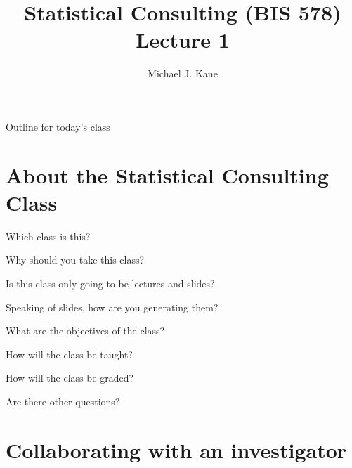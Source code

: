 \documentclass[14pt]{beamer}
\title{Statistical Consulting (BIS 578) Lecture 1}
\author{Michael J. Kane}
\date{}
\begin{document}
\begin{frame}
  \titlepage
\end{frame}

\begin{frame}{Outline for today's class}
  \tableofcontents
  \let\thefootnote\relax{}
\end{frame}

\section{About the Statistical Consulting Class}

\begin{frame}{Which class is this?}
\end{frame}

\begin{frame}{Why should you take this class?}
\end{frame}

\begin{frame}{Is this class only going to be lectures and slides?}
\end{frame}

\begin{frame}{Speaking of slides, how are you generating them?}
\end{frame}

\begin{frame}{What are the objectives of the class?}
\end{frame}

\begin{frame}{How will the class be taught?}
\end{frame}

\begin{frame}{How will the class be graded?}
\end{frame}

\begin{frame}
Are there other questions?
\end{frame}

\section{Collaborating with an investigator}

\subsection*{}
\end{document}
